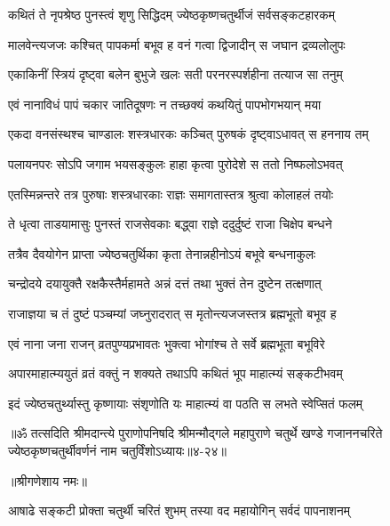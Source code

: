 \twolineshloka
{कथितं ते नृपश्रेष्ठ पुनस्त्वं श‍ृणु सिद्धिदम्}
{ज्येष्ठकृष्णचतुर्थीजं सर्वसङ्कटहारकम्} %

\twolineshloka
{मालवेन्त्यजजः कश्चित् पापकर्मा बभूव ह}
{वनं गत्वा द्विजादीन् स जघान द्रव्यलोलुपः} %

\twolineshloka
{एकाकिनीं स्त्रियं दृष्ट्वा बलेन बुभुजे खलः}
{सती परनरस्पर्शहीना तत्याज सा तनुम्} %

\twolineshloka
{एवं नानाविधं पापं चकार जातिदूषणः}
{न तच्छक्यं कथयितुं पापभोगभयान् मया} %

\twolineshloka
{एकदा वनसंस्थश्च चाण्डालः शस्त्रधारकः}
{कञ्चित् पुरुषकं दृष्ट्वाऽधावत् स हननाय तम्} %

\twolineshloka
{पलायनपरः सोऽपि जगाम भयसङ्कुलः}
{हाहा कृत्वा पुरोदेशे स ततो निष्फलोऽभवत्} %

\twolineshloka
{एतस्मिन्नन्तरे तत्र पुरुषाः शस्त्रधारकाः}
{राज्ञः समागतास्तत्र श्रुत्वा कोलाहलं तयोः} %

\twolineshloka
{ते धृत्वा ताडयामासुः पुनस्तं राजसेवकाः}
{बद्ध्वा राज्ञे ददुर्दुष्टं राजा चिक्षेप बन्धने} %

\twolineshloka
{तत्रैव दैवयोगेन प्राप्ता ज्येष्ठचतुर्थिका}
{कृता तेनान्नहीनोऽयं बभूवे बन्धनाकुलः} %

\twolineshloka
{चन्द्रोदये दयायुक्तै रक्षकैस्तैर्महामते}
{अन्नं दत्तं तथा भुक्तं तेन दुष्टेन तत्क्षणात्} %

\twolineshloka
{राजाज्ञया च तं दुष्टं पञ्चम्यां जघ्नुरादरात्}
{स मृतोन्त्यजजस्तत्र ब्रह्मभूतो बभूव ह} %

\twolineshloka
{एवं नाना जना राजन् व्रतपुण्यप्रभावतः}
{भुक्त्वा भोगांश्च ते सर्वे ब्रह्मभूता बभूविरे} %

\twolineshloka
{अपारमाहात्म्ययुतं व्रतं वक्तुं न शक्यते}
{तथाऽपि कथितं भूप माहात्म्यं सङ्कटीभवम्} %

\twolineshloka
{इदं ज्येष्ठचतुर्थ्यास्तु कृष्णायाः संश‍ृणोति यः}
{माहात्म्यं वा पठति स लभते स्वेप्सितं फलम्} %

॥ॐ तत्सदिति श्रीमदान्त्ये पुराणोपनिषदि श्रीमन्मौद्गले महापुराणे चतुर्थे खण्डे गजाननचरिते ज्येष्ठकृष्णचतुर्थीवर्णनं नाम चतुर्विंशोऽध्यायः॥४-२४॥


\label{sec:ashadha-krishna-chaturthi-mahatmya-varnanam}

\centerline{॥श्रीगणेशाय नमः॥}


\twolineshloka
{आषाढे सङ्कटी प्रोक्ता चतुर्थी चरितं शुभम्}
{तस्या वद महायोगिन् सर्वदं पापनाशनम्} %

